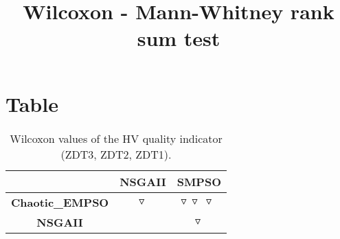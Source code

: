 \documentclass{article}
\title{Wilcoxon - Mann-Whitney rank sum test}
\author{}
\begin{document}
\maketitle
\section{Table}
\begin{table}[!htp]
  \caption{Wilcoxon values of the HV quality indicator (ZDT3, ZDT2, ZDT1).}
  \label{table:HV}
  \centering
  \begin{scriptsize}
  \begin{tabular}{c|cc}
      & \textbf{NSGAII} & \textbf{SMPSO} \\\hline
      \textbf{Chaotic_EMPSO} & $\triangledown\  $ & $ \triangledown\ \triangledown\ \triangledown\ $ \\
      \textbf{NSGAII} & $ $ & $ \triangledown\ $ \\
  \end{tabular}
  \end{scriptsize}
\end{table}
\end{document}
